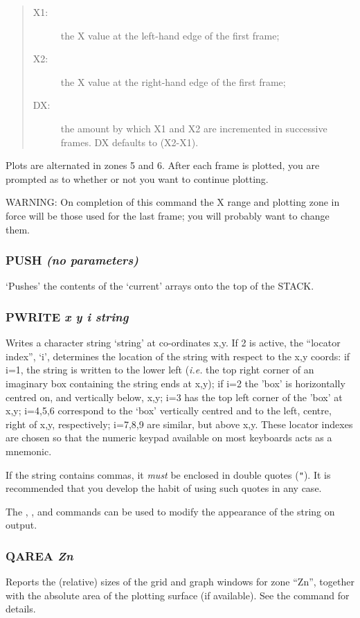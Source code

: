 \documentclass[twoside,11pt,noabs,nolof]{starlink}
\providecommand{\dipcom}[3]{\subsubsection*{\label{COM:#1}\xlabel{COM:#1}\textbf{#1} \emph{#2}}}
\newenvironment{dipdesc}{\begin{description}}{\end{description}}
\providecommand{\dipitem}[2]{ \item[{#1}] {#2} }
\begin{document}
\begin{quote}
\begin{dipdesc}
\dipitem {X1:}{ the X value at the left-hand edge of the first frame;}
\dipitem {X2:}{ the X value at the right-hand edge of the first frame;}
\dipitem {DX:}{ the amount by which X1 and X2 are incremented in
successive frames. DX defaults to (X2-X1).}
\end{dipdesc}
\end{quote}

Plots are alternated in zones 5 and 6. After each frame is plotted,
you are prompted as to whether or not you want to continue plotting.

WARNING: On completion of this command the X range and plotting zone
in force will be those used for the last frame; you will probably want
to change them.

\dipcom{PUSH}{(no parameters)}{Pushes the current arrays onto the stack}
`Pushes' the contents of the `current' arrays onto the top of the STACK.

\dipcom{PWRITE}{x y i string}{Writes a character string at given co-ordinates}
Writes a character string `string' at co-ordinates x,y. If   2 is
active, the ``locator index'', `i', determines the location of the
string with respect to the x,y coords: if i=1, the string is written
to the lower left (\emph{i.e.} the top right corner of an imaginary
box containing the string ends at x,y); if i=2 the 'box' is
horizontally centred on, and vertically below, x,y; i=3 has the top
left corner of the 'box' at x,y; i=4,5,6 correspond to the `box'
vertically centred and to the left, centre, right of x,y,
respectively; i=7,8,9 are similar, but above x,y. These locator
indexes are chosen so that the numeric keypad available on most
keyboards acts as a mnemonic.

If the string contains commas, it \emph{must} be enclosed in double
quotes ({\texttt{"}}).  It is recommended that you develop the habit of
using such quotes in any case.

The ,  ,  and   commands can be used to modify the
appearance of the string on output.

\dipcom{QAREA}{Zn}{Gives information about a plotting zone}
Reports the (relative) sizes of the grid and graph windows for zone
``Zn'', together with the absolute area of the plotting surface (if
available). See the   command for details.
\end{document}

